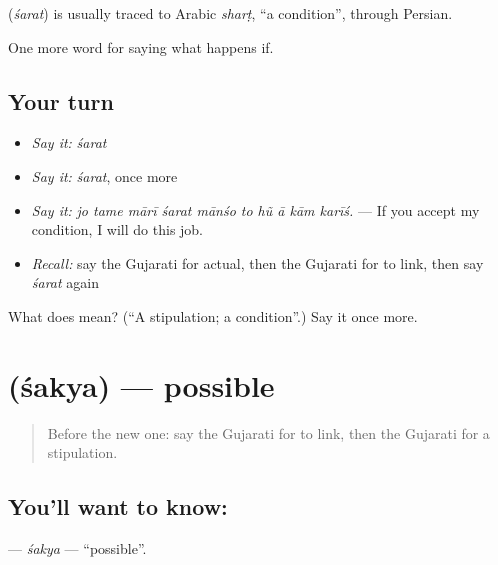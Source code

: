 \begin{cousinweb}
\textbf{} (\emph{śarat}) is usually traced to Arabic \emph{sharṭ}, \textquotedblleft{}a condition\textquotedblright{}, through Persian.
\end{cousinweb}

\begin{grammarlens}[title={What you've built}]
One more word for saying what happens if.
\end{grammarlens}

\subsection*{Your turn}
\begin{itemize}
\raggedright
  \item \emph{Say it:} \emph{śarat}
  \item \emph{Say it:} \emph{śarat}, once more
  \item \emph{Say it:} \emph{jo tame mārī śarat mānśo to hũ ā kām karīś.} — If you accept my condition, I will do this job.
  \item \emph{Recall:} say the Gujarati for actual, then the Gujarati for to link, then say \emph{śarat} again
\end{itemize}

\begin{tcolorbox}[breakable,colback=teal!4,colframe=teal!35!black,title={Before you move on}]
What does  mean? (\textquotedblleft{}A stipulation; a condition\textquotedblright{}.) Say it once more.
\end{tcolorbox}
\section[\texorpdfstring{\gu{શક્ય} (śakya)}{શક્ય (śakya)}]{ (śakya) — possible}

\label{lesson:GU-C366-sakya}



\begin{quote}
Before the new one: say the Gujarati for to link, then the Gujarati for a stipulation.
\end{quote}

\subsection*{You'll want to know: }
\textbf{} — \emph{śakya} — \textquotedblleft{}possible\textquotedblright{}.

